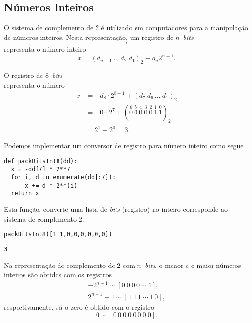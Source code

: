 \subsection{Números Inteiros}

O sistema de complemento de 2 é utilizado em computadores para a manipulação de números inteiros. Nesta representação, um registro de $n$~{\it bits}
\begin{equation}
  [d_1 ~ d_2 ~ d_3 ~ \cdots ~ d_n],
\end{equation}
representa o número inteiro
\begin{equation}
  x = (d_{n-1}~\ldots~d_2~d_1)_2 - d_n2^{n-1}.
\end{equation}

\begin{ex}
  O registro de 8~{\it bits}
  \begin{equation}
    [1 ~ 1 ~ 0 ~ 0 ~ 0 ~ 0 ~ 0 ~ 0]
  \end{equation}
  representa o número
  \begin{align}
    x &= -d_8\cdot 2^{8-1} + (d_7~d_6~\ldots~d_1)_2\\
      &= -0\cdots 2^{7} + (\stackrel{6}{0}~\stackrel{5}{0}~\stackrel{4}{0}~\stackrel{3}{0}~\stackrel{2}{0}~\stackrel{1}{1}~\stackrel{0}{1})_2\\
      &= 2^1 + 2^0 = 3.
  \end{align}
  
  Podemos implementar um conversor de registro para número inteiro como segue

\begin{lstlisting}[caption=packbits8.py, label=cod:packbits8]
def packBitsInt8(dd):
  x = -dd[7] * 2**7
  for i, d in enumerate(dd[:7]):
      x += d * 2**(i)
  return x
\end{lstlisting}

Esta função, converte uma lista de {\it bits} (registro) no inteiro corresponde ao sistema de complemento 2.

\begin{lstlisting}
packBitsInt8([1,1,0,0,0,0,0,0])
\end{lstlisting}

\begin{verbatim}
3
\end{verbatim}
\end{ex}

Na representação de complemento de 2 com $n$~{\it bits}, o menor e o maior números inteiros são obtidos com os registros
\begin{gather}
  -2^{n-1} \sim [0 ~ 0 ~ 0 ~ 0 ~ \cdots ~ 1],\\
  2^{n-1}-1 \sim [1 ~ 1 ~ 1 ~ \cdots ~ 1 ~ 0],
\end{gather}
respectivamente. Já o zero é obtido com o registro
\begin{equation}
  0 \sim [0 ~ 0 ~ 0 ~ 0 ~ 0 ~ 0 ~ 0 ~ 0].
\end{equation}

